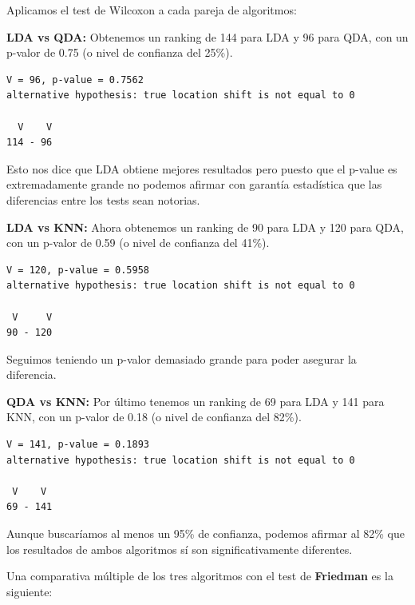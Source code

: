 \vspace{\baselineskip}

Aplicamos el test de Wilcoxon a cada pareja de algoritmos:

\vspace{\baselineskip}

\textbf{LDA vs QDA:} Obtenemos un ranking de 144 para LDA y 96 para QDA, con un p-valor de 0.75 (o nivel de confianza del 25\%).
\begin{verbatim}
V = 96, p-value = 0.7562
alternative hypothesis: true location shift is not equal to 0

  V    V
114 - 96 
\end{verbatim}

Esto nos dice que LDA obtiene mejores resultados pero puesto que el p-value es extremadamente grande no podemos afirmar con garantía estadística que las diferencias entre los tests sean notorias.

\vspace{\baselineskip}

\textbf{LDA vs KNN:} Ahora obtenemos un ranking de 90 para LDA y 120 para QDA, con un p-valor de 0.59 (o nivel de confianza del 41\%).
\begin{verbatim}
V = 120, p-value = 0.5958
alternative hypothesis: true location shift is not equal to 0

 V     V
90 - 120 
\end{verbatim}

Seguimos teniendo un p-valor demasiado grande para poder asegurar la diferencia.

\vspace{\baselineskip}

\textbf{QDA vs KNN:} Por último tenemos un ranking de 69 para LDA y 141 para KNN, con un p-valor de 0.18 (o nivel de confianza del 82\%).
\begin{verbatim}
V = 141, p-value = 0.1893
alternative hypothesis: true location shift is not equal to 0

 V    V
69 - 141
\end{verbatim}

Aunque buscaríamos al menos un 95\% de confianza, podemos afirmar al 82\% que los resultados de ambos algoritmos sí son significativamente diferentes.

\vspace{\baselineskip}
\vspace{\baselineskip}

Una comparativa múltiple de los tres algoritmos con el test de \textbf{Friedman} es la siguiente:

